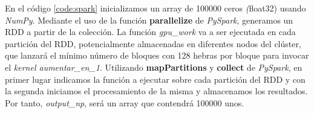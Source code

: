 En el código \ref{code:spark} inicializamos un array de 100000 ceros \textit(float32) usando \textit{NumPy}. Mediante el uso de la función \textbf{parallelize} de \textit{PySpark}, generamos un RDD a partir de la colección. La función \textit{gpu\_work} va a ser ejecutada en cada partición del RDD, potencialmente almacenadas en diferentes nodos del clúster, que lanzará el mínimo número de bloques con 128 hebras por bloque para invocar el \textit{kernel aumentar\_en\_1}. Utilizando \textbf{mapPartitions} y \textbf{collect} de \textit{PySpark}, en primer lugar indicamos la función a ejecutar sobre cada partición del RDD y con la segunda iniciamos el procesamiento de la misma y almacenamos los resultados. Por tanto, \textit{output\_np}, será un array que contendrá 100000 unos.